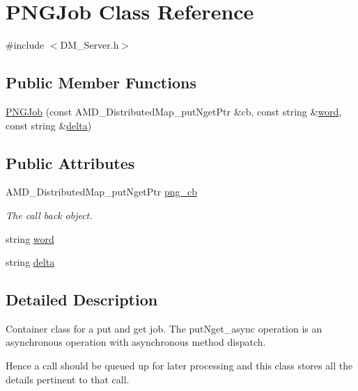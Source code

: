 \hypertarget{class_p_n_g_job}{
\section{PNGJob Class Reference}
\label{class_p_n_g_job}
}


{\ttfamily \#include $<$DM\_\-Server.h$>$}

\subsection*{Public Member Functions}
\begin{DoxyCompactItemize}
\item 
\hyperlink{class_p_n_g_job_ac11a419aaeb0086fa6580f0f11c44db0}{PNGJob} (const AMD\_\-DistributedMap\_\-putNgetPtr \&cb, const string \&\hyperlink{class_p_n_g_job_a7223a76a5e6fde2dcaeab8186e22c805}{word}, const string \&\hyperlink{class_p_n_g_job_a98b48618013386d8882f8e8f20db297f}{delta})
\end{DoxyCompactItemize}
\subsection*{Public Attributes}
\begin{DoxyCompactItemize}
\item 
AMD\_\-DistributedMap\_\-putNgetPtr \hyperlink{class_p_n_g_job_adcdd819579a1e45da875aefb5bd72954}{png\_\-cb}
\begin{DoxyCompactList}\small\item\em The call back object. \item\end{DoxyCompactList}\item 
string \hyperlink{class_p_n_g_job_a7223a76a5e6fde2dcaeab8186e22c805}{word}
\item 
string \hyperlink{class_p_n_g_job_a98b48618013386d8882f8e8f20db297f}{delta}
\end{DoxyCompactItemize}


\subsection{Detailed Description}
Container class for a put and get job. The putNget\_\-async operation is an asynchronous operation with asynchronous method dispatch.

Hence a call should be queued up for later processing and this class stores all the details pertinent to that call. 

